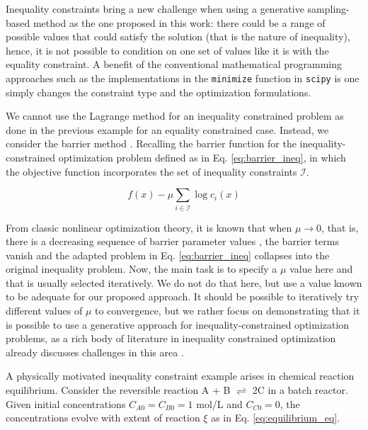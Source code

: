 \documentclass{achemso}
\begin{document}
Inequality constraints bring a new challenge when using a generative sampling-based method as the one proposed in this work: there could be a range of possible values that could satisfy the solution (that is the nature of inequality), hence, it is not possible to condition on one set of values like it is with the equality constraint. A benefit of the conventional mathematical programming approaches such as the implementations in the \texttt{minimize} function in \texttt{scipy} is one simply changes the constraint type and the optimization formulations.

We cannot use the Lagrange method for an inequality constrained problem as done in the previous example for an equality constrained case. Instead, we consider the barrier method \cite{nocedal2006numerical}. Recalling the barrier function for the inequality-constrained optimization problem defined as in Eq. \ref{eq:barrier_ineq}, in which the objective function incorporates the set of inequality constraints \(\mathcal{I}\).

\begin{equation} \label{eq:barrier_ineq}
f(x)-\mu \sum_{i \in \mathcal{I}} \log c_i(x)
\end{equation}

From classic nonlinear optimization theory, it is known that when \(\mu \to 0\), that is, there is a decreasing sequence of barrier parameter values \cite{wachter2006implementation}, the barrier terms vanish and the adapted problem in Eq. \ref{eq:barrier_ineq} collapses into the original inequality problem. Now, the main task is to specify a \(\mu\) value here and that is usually selected iteratively. We do not do that here, but use a value known to be adequate for our proposed approach. It should be possible to iteratively try different values of \(\mu\) to convergence, but we rather focus on demonstrating that it is possible to use a generative approach for inequality-constrained optimization problems, as a rich body of literature in inequality constrained optimization already discusses challenges in this area \cite{nocedal2006numerical,wachter2006implementation}.

A physically motivated inequality constraint example arises in chemical reaction equilibrium. Consider the reversible reaction A + B $\rightleftharpoons$ 2C in a batch reactor. Given initial concentrations \(C_{A0} = C_{B0} = 1\) mol/L and \(C_{C0} = 0\), the concentrations evolve with extent of reaction \(\xi\) as in Eq. \ref{eq:equilibrium_eq}.
\end{document}

